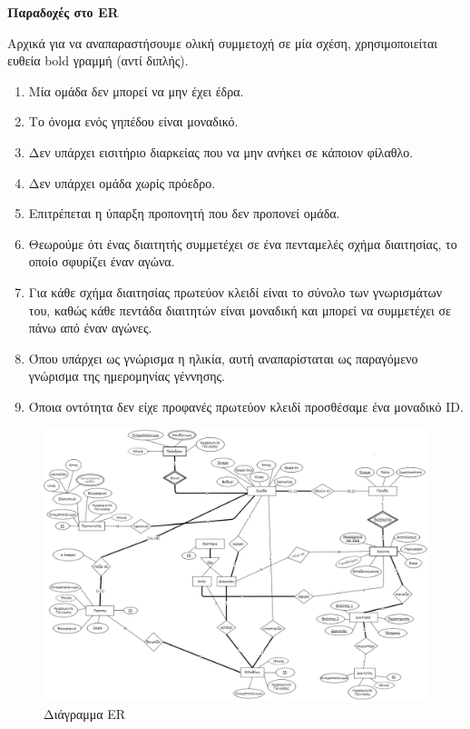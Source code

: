 \documentclass[a4paper,oneside,titlepage,11pt]{article}
\begin{document}


\newpage


{\Large \noindent \textbf{Παραδοχές στο ER}}

\vspace{0.3cm}

\noindent Αρχικά για να αναπαραστήσουμε ολική συμμετοχή σε μία σχέση, χρησιμοποιείται ευθεία bold γραμμή (αντί διπλής).

\begin{enumerate}
\item Μία ομάδα δεν μπορεί να μην έχει έδρα.
\item Το όνομα ενός γηπέδου είναι μοναδικό.
\item Δεν υπάρχει εισιτήριο διαρκείας που να μην ανήκει σε κάποιον φίλαθλο.
\item Δεν υπάρχει ομάδα χωρίς πρόεδρο.
\item Επιτρέπεται η ύπαρξη προπονητή που δεν προπονεί ομάδα.
\item Θεωρούμε ότι ένας διαιτητής συμμετέχει σε ένα πενταμελές σχήμα διαιτησίας, το οποίο σφυρίζει έναν αγώνα. 
\item  Για κάθε σχήμα διαιτησίας πρωτεύον κλειδί είναι το σύνολο των γνωρισμάτων του, καθώς κάθε πεντάδα διαιτητών είναι μοναδική και μπορεί να συμμετέχει σε πάνω από έναν αγώνες.
\item  Όπου υπάρχει ως γνώρισμα η ηλικία, αυτή αναπαρίσταται ως παραγόμενο γνώρισμα της ημερομηνίας γέννησης.
\item  Όποια οντότητα δεν είχε προφανές πρωτεύον κλειδί προσθέσαμε ένα μοναδικό ID.

\end{enumerate}

\begin{landscape}
\begin{figure}
\centering
\includegraphics[scale=0.75]{er.png} 
\caption{Διάγραμμα ER}
\end{figure}
\end{landscape}
\end{document}
